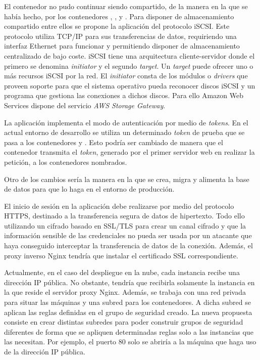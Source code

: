 El contenedor  no pudo continuar siendo compartido, de la manera en la que se había hecho, por los contenedores , ,  y . Para disponer de almacenamiento compartido entre ellos se propone la aplicación del protocolo iSCSI. Este protocolo utiliza TCP/IP para sus transferencias de datos, requiriendo una interfaz Ethernet para funcionar y permitiendo disponer de almacenamiento centralizado de bajo coste. iSCSI tiene una arquitectura cliente-servidor donde el primero se denomina \textit{initiator} y el segundo \textit{target}. Un \textit{target} puede ofrecer uno o más recursos iSCSI por la red. El \textit{initiator} consta de los módulos o \textit{drivers} que proveen soporte para que el sistema operativo pueda reconocer discos iSCSI y un programa que gestiona las conexiones a dichos discos. Para ello Amazon Web Services dispone del servicio \textit{AWS Storage Gateway}.

La aplicación implementa el modo de autenticación por medio de \textit{tokens}. En el actual entorno de desarrollo se utiliza un determinado \textit{token} de prueba que se pasa a los contenedores  y . Esto podría ser cambiado de manera que el contenedor  transmita el \textit{token}, generado por el primer servidor web en realizar la petición, a los contenedores nombrados.

Otro de los cambios sería la manera en la que se crea, migra y alimenta la base de datos para que lo haga en el entorno de producción. 

El inicio de sesión en la aplicación debe realizarse por medio del protocolo HTTPS, destinado a la transferencia segura de datos de hipertexto. Todo ello utilizando un cifrado basado en SSL/TLS para crear un canal cifrado y que la información sensible de las credenciales no pueda ser usada por un atacante que haya conseguido interceptar la transferencia de datos de la conexión. Además, el proxy inverso Nginx tendría que instalar el certificado SSL correspondiente.

Actualmente, en el caso del despliegue en la nube, cada instancia recibe una dirección IP pública. No obstante, tendría que recibirla solamente la instancia en la que reside el servidor proxy Nginx. Además, se trabaja con una red privada para situar las máquinas y una subred para los contenedores. A dicha subred se aplican las reglas definidas en el grupo de seguridad creado. La nueva propuesta consiste en crear distintas subredes para poder construir grupos de seguridad diferentes de forma que se apliquen determinadas reglas solo a las instancias que las necesitan. Por ejemplo, el puerto 80 solo se abriría a la máquina que haga uso de la dirección IP pública.

